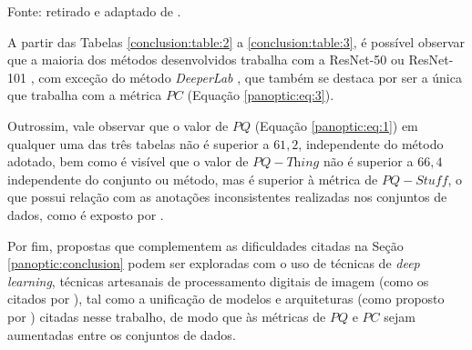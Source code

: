 \begin{table}[H]
    \centering
    \caption{Comparação de desempenho no \textit{dataset} Mapillary.}
    \label{conclusion:table:3}

    \vspace*{1 cm}
    Fonte: retirado e adaptado de \cite{Li2020Awesome-Panoptic-Segmentation}.
\end{table}

A partir das Tabelas \ref{conclusion:table:2} a \ref{conclusion:table:3}, é possível observar que a maioria dos métodos desenvolvidos trabalha com a ResNet-50 ou ResNet-101 \cite{He2016}, com exceção do método \textit{DeeperLab} \cite{Yang2019}, que também se destaca por ser a única que trabalha com a métrica $PC$ (Equação \ref{panoptic:eq:3}).

Outrossim, vale observar que o valor de $PQ$ (Equação \ref{panoptic:eq:1}) em qualquer uma das três tabelas não é superior a $61,2$, independente do método adotado, bem como é visível que o valor de $PQ-\textit{Thing}$ não é superior a  $66,4$ independente do conjunto ou método, mas é superior à métrica de $PQ-\textit{Stuff}$, o que possui relação com as anotações inconsistentes realizadas nos conjuntos de dados, como é exposto por \cite{Kirillov2019a}.

Por fim, propostas que complementem as dificuldades citadas na Seção \ref{panoptic:conclusion} podem ser exploradas com o uso de técnicas de \textit{deep learning}, técnicas artesanais de processamento digitais de imagem (como os citados por \cite{pedrini2008analise}), tal como a unificação de modelos e arquiteturas (como proposto por \cite{Liu2019}) citadas nesse trabalho, de modo que às métricas de $PQ$ e $PC$ sejam aumentadas entre os conjuntos de dados.